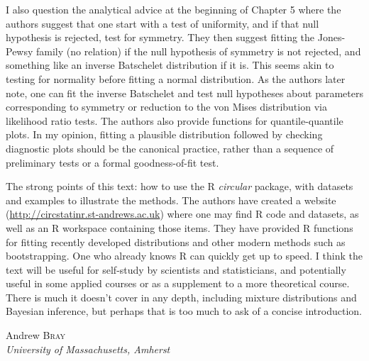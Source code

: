 \documentclass[12pt]{article}
\newenvironment{references}{
  \begin{center} \textsf{REFERENCES} \end{center}
  \begin{list}{}{\topsep=0pt\parsep=0pt\baselineskip=20pt
   \leftmargin=1.5em\itemindent=-\leftmargin}}
  {\end{list}}
\begin{document}
I also question the analytical advice at the beginning of Chapter 5
where the authors suggest that one start with a test of uniformity,
and if that null hypothesis is rejected, test for symmetry.  They then
suggest fitting the Jones-Pewsy family (no relation) if the null hypothesis of
symmetry is not rejected, and something like an inverse Batschelet
distribution if it is.  This seems akin to testing for normality
before fitting a normal distribution.  As the authors later note, one
can fit the inverse Batschelet and test null hypotheses about
parameters corresponding to symmetry or reduction to the von Mises
distribution via likelihood ratio tests. The authors also provide
functions for quantile-quantile plots.  In my opinion, fitting a
plausible distribution followed by checking diagnostic plots should be
the canonical practice, rather than a sequence of preliminary tests or
a formal goodness-of-fit test.

The strong points of this text: how to use the R {\em circular}
package, with datasets and examples to illustrate the methods.  The
authors have created a website (\url{http://circstatinr.st-andrews.ac.uk})
where one may find R code and datasets, as well as an R
workspace containing those items.  They have provided R functions for
fitting recently developed distributions and other modern methods such
as bootstrapping.  One who already knows R can quickly get up to
speed.  I think the text will be useful for self-study by scientists
and statisticians, and potentially useful in some applied courses or
as a supplement to a more theoretical course.  There is much it doesn't
cover in any depth, including mixture distributions and Bayesian inference,
but perhaps that is too much to ask of a concise introduction.




\begin{flushright}\def\baselinestretch{1}
Andrew \textsc{Bray}\\
\emph{University of Massachusetts, Amherst}

\end{flushright}


%
\end{document}

